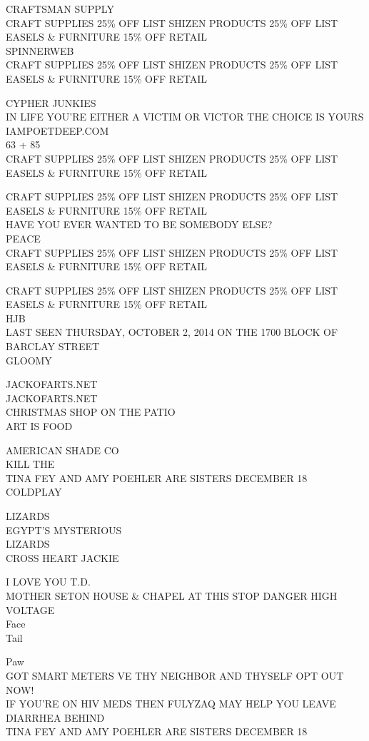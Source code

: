 \documentclass[10pt,letterpaper]{article}
\begin{document}
CRAFTSMAN SUPPLY\\
CRAFT SUPPLIES 25\% OFF LIST SHIZEN PRODUCTS 25\% OFF LIST EASELS \& FURNITURE 15\% OFF RETAIL\\
SPINNERWEB\\
CRAFT SUPPLIES 25\% OFF LIST SHIZEN PRODUCTS 25\% OFF LIST EASELS \& FURNITURE 15\% OFF RETAIL

CYPHER JUNKIES\\
IN LIFE YOU'RE EITHER A VICTIM OR VICTOR THE CHOICE IS YOURS IAMPOETDEEP.COM\\
63 + 85\\
CRAFT SUPPLIES 25\% OFF LIST SHIZEN PRODUCTS 25\% OFF LIST EASELS \& FURNITURE 15\% OFF RETAIL

CRAFT SUPPLIES 25\% OFF LIST SHIZEN PRODUCTS 25\% OFF LIST EASELS \& FURNITURE 15\% OFF RETAIL\\
HAVE YOU EVER WANTED TO BE SOMEBODY ELSE?\\
PEACE\\
CRAFT SUPPLIES 25\% OFF LIST SHIZEN PRODUCTS 25\% OFF LIST EASELS \& FURNITURE 15\% OFF RETAIL

CRAFT SUPPLIES 25\% OFF LIST SHIZEN PRODUCTS 25\% OFF LIST EASELS \& FURNITURE 15\% OFF RETAIL\\
HJB\\
LAST SEEN THURSDAY, OCTOBER 2, 2014 ON THE 1700 BLOCK OF BARCLAY STREET\\
GLOOMY

JACKOFARTS.NET\\
JACKOFARTS.NET\\
CHRISTMAS SHOP ON THE PATIO\\
ART IS FOOD

AMERICAN SHADE CO\\
KILL THE\\
TINA FEY AND AMY POEHLER ARE SISTERS DECEMBER 18\\
COLDPLAY

LIZARDS\\
EGYPT'S MYSTERIOUS\\
LIZARDS\\
CROSS HEART JACKIE

I LOVE YOU T.D.\\
MOTHER SETON HOUSE \& CHAPEL AT THIS STOP DANGER HIGH VOLTAGE\\
Face\\
Tail

Paw\\
GOT SMART METERS VE THY NEIGHBOR AND THYSELF OPT OUT NOW!\\
IF YOU'RE ON HIV MEDS THEN FULYZAQ MAY HELP YOU LEAVE DIARRHEA BEHIND\\
TINA FEY AND AMY POEHLER ARE SISTERS DECEMBER 18
\end{document}
